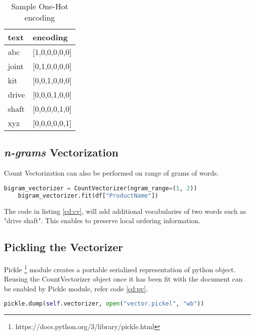 \begin{table}[]
    \centering
    \caption{Sample One-Hot encoding}
    \label{table:countencode}
    \begin{tabular}{ ll }
          \toprule
          
          \textbf{text}& \textbf{encoding}\\
          \midrule
          abc&[1,0,0,0,0,0]\\
          joint&[0,1,0,0,0,0]\\
          kit&[0,0,1,0,0,0]\\
          drive&[0,0,0,1,0,0]\\
          shaft&[0,0,0,0,1,0]\\
          xyz&[0,0,0,0,0,1]\\
       
          \bottomrule
          \end{tabular}
\end{table}

\subsection{ \textit{n-grams} Vectorization} \label{sec:ngram_vector}

Count Vectorization can also be performed on range of grams of words. 

\begin{lstlisting}[language=Python,label=ngramcode, caption={\textit{n-gram} vectorization},label={cd:cv}]
    bigram_vectorizer = CountVectorizer(ngram_range=(1, 2))
    bigram_vectorizer.fit(df["ProductName"])
\end{lstlisting}


The code in listing \ref{cd:cv}, will add additional vocabularies of two words such as "drive shaft". This enables to preserve local ordering information. 

\subsection{Pickling the Vectorizer} \label{pickle_vector}

Pickle \footnote{https://docs.python.org/3/library/pickle.html} module creates a portable serialized representation of python object. Reusing the CountVectorizer object once it has been fit with the document can be enabled by Pickle module, refer code \ref{cd:pv}. 

\begin{lstlisting}[language=Python,label=pickle, caption={Pickle vectorization},label={cd:pv}]
    pickle.dump(self.vectorizer, open("vector.pickel", "wb"))
\end{lstlisting}

